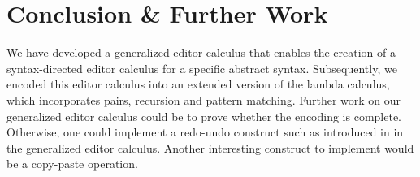 \documentclass[sigplan,anonymous,review]{acmart}
\begin{document}
\section{Conclusion \& Further Work}
We have developed a generalized editor calculus that enables the creation of a syntax-directed editor calculus for a specific abstract syntax. Subsequently, we encoded this editor calculus into an extended version of the lambda calculus, which incorporates pairs, recursion and pattern matching.
Further work on our generalized editor calculus could be to prove whether the encoding is complete. Otherwise, one could implement a redo-undo construct such as introduced in \cite{undo_Edit} in the generalized editor calculus. Another interesting construct to implement would be a copy-paste operation.






\end{document}
